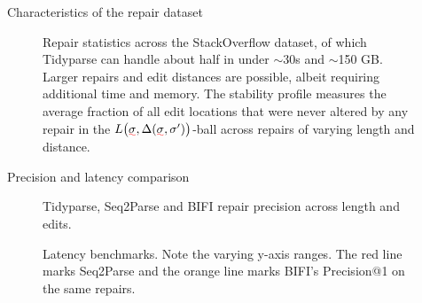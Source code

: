 \documentclass{beamer}
\begin{document}
\begin{frame}[fragile]{Characteristics of the repair dataset}
\begin{figure}[h!]
    \caption{Repair statistics across the StackOverflow dataset, of which Tidyparse can handle about half in under $\sim$30s and $\sim$150 GB. Larger repairs and edit distances are possible, albeit requiring additional time and memory. The stability profile measures the average fraction of all edit locations that were never altered by any repair in the $L\big(\err\sigma, \Delta(\err\sigma, \sigma')\big)$-ball across repairs of varying length and distance.}\label{fig:patch_stats}
  \end{figure}
\end{frame}

\begin{frame}[fragile]{Precision and latency comparison}
  \begin{figure}[h!]
    \resizebox{.24\textwidth}{!}{}
    \resizebox{.24\textwidth}{!}{}
    \resizebox{.24\textwidth}{!}{}
    \resizebox{.24\textwidth}{!}{}
    \caption{Tidyparse, Seq2Parse and BIFI repair precision across length and edits.}
  \end{figure}
  \begin{figure}[h!]
    \resizebox{.24\textwidth}{!}{}
    \resizebox{.24\textwidth}{!}{}
    \resizebox{.24\textwidth}{!}{}
    \resizebox{.24\textwidth}{!}{}
    \caption{Latency benchmarks. Note the varying y-axis ranges. The red line marks Seq2Parse and the orange line marks BIFI's Precision@1 on the same repairs.}\label{fig:human}
  \end{figure}
\end{frame}
\end{document}
